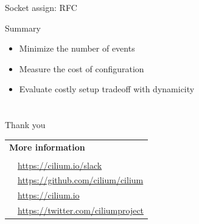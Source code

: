 \documentclass[black,white]{beamer}
\DeclareRobustCommand{\#}{\adjustbox{valign=B,totalheight=.57\baselineskip}{\oldhash}}%
\newcommand{\link}[1]{{\large\color{blue}\href{#1}{#1}}}
\begin{document}
    \begin{frame}[fragile]{Socket assign: RFC}
        \centering
        
    \end{frame}

    \begin{frame}{Summary}
        \begin{itemize}
            \item Minimize the number of events \medskip
            \item Measure the cost of configuration \medskip
            \item Evaluate costly setup tradeoff with dynamicity \medskip
        \end{itemize}
    \end{frame}

    \section*{}
    \begin{frame}{Thank you}
        \centering
        \vfill
        \begin{table}
            \begin{subtable}[l]{0.6\textwidth}
            \begin{tabular}{rl}
                \multicolumn{2}{l}{\textbf{More information}} \\ \\
                
                & \link{https://cilium.io/slack} \\
                
                & \link{https://github.com/cilium/cilium} \\
                
                & \link{https://cilium.io} \\
                
                & \link{https://twitter.com/ciliumproject} \\
            \end{tabular}
            \end{subtable}
            \begin{subtable}[r]{0.35\textwidth}
                
            \end{subtable}
        \end{table}
        \pause
        \vfill
    \end{frame}
\end{document}
